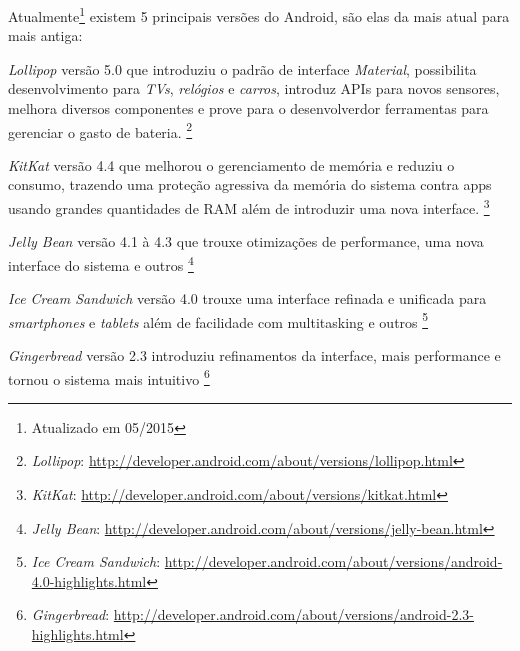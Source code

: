 \documentclass[a4paper,12pt,brazil,oneside]{book}
\begin{document}
Atualmente\footnote{Atualizado em 05/2015} existem 5 principais versões do Android, são elas da mais atual para mais antiga:
\bi
\item \emph{Lollipop} versão 5.0 que introduziu o padrão de interface \emph{Material}, possibilita desenvolvimento para \emph{TVs}, \emph{relógios} e \emph{carros}, introduz APIs para novos sensores, melhora diversos componentes e prove para o desenvolverdor ferramentas para gerenciar o gasto de bateria.
\footnote{\emph{Lollipop}: \href{http://developer.android.com/about/versions/lollipop.html}{http://developer.android.com/about/versions/lollipop.html}}
\item \emph{KitKat} versão 4.4 que melhorou o gerenciamento de memória e reduziu o consumo, trazendo uma proteção agressiva da memória do sistema contra apps usando grandes quantidades de RAM além de introduzir uma nova interface.
\footnote{\emph{KitKat}: \href{http://developer.android.com/about/versions/kitkat.html}{http://developer.android.com/about/versions/kitkat.html}}
\item \emph{Jelly Bean} versão 4.1 à 4.3 que trouxe otimizações de performance, uma nova interface do sistema e outros
\footnote{\emph{Jelly Bean}: \href{http://developer.android.com/about/versions/jelly-bean.html}{http://developer.android.com/about/versions/jelly-bean.html}}
\item \emph{Ice Cream Sandwich} versão 4.0 trouxe uma interface refinada e unificada para \emph{smartphones} e \emph{tablets} além de facilidade com multitasking e outros
\footnote{\emph{Ice Cream Sandwich}: \href{http://developer.android.com/about/versions/android-4.0-highlights.html}{http://developer.android.com/about/versions/android-4.0-highlights.html}}
\item \emph{Gingerbread} versão 2.3 introduziu refinamentos da interface, mais performance e tornou o sistema mais intuitivo
\footnote{\emph{Gingerbread}: \href{http://developer.android.com/about/versions/android-2.3-highlights.html}{http://developer.android.com/about/versions/android-2.3-highlights.html}}
\ei
\end{document}
